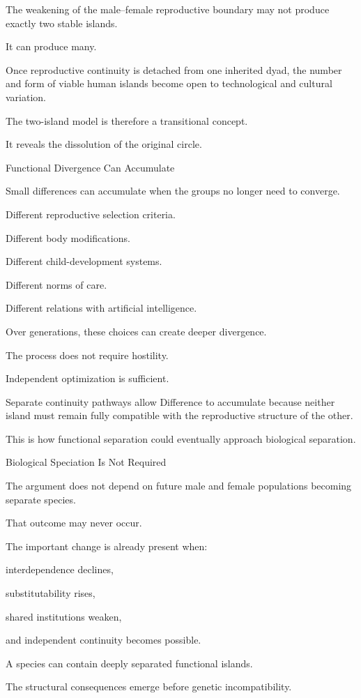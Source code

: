 The weakening of the male–female reproductive boundary may not produce exactly two stable islands.

It can produce many.

Once reproductive continuity is detached from one inherited dyad, the number and form of viable human islands become open to technological and cultural variation.

The two-island model is therefore a transitional concept.

It reveals the dissolution of the original circle.

Functional Divergence Can Accumulate

Small differences can accumulate when the groups no longer need to converge.

Different reproductive selection criteria.

Different body modifications.

Different child-development systems.

Different norms of care.

Different relations with artificial intelligence.

Over generations, these choices can create deeper divergence.

The process does not require hostility.

Independent optimization is sufficient.

Separate continuity pathways allow Difference to accumulate because neither island must remain fully compatible with the reproductive structure of the other.

This is how functional separation could eventually approach biological separation.

Biological Speciation Is Not Required

The argument does not depend on future male and female populations becoming separate species.

That outcome may never occur.

The important change is already present when:

interdependence declines,

substitutability rises,

shared institutions weaken,

and independent continuity becomes possible.

A species can contain deeply separated functional islands.

The structural consequences emerge before genetic incompatibility.

